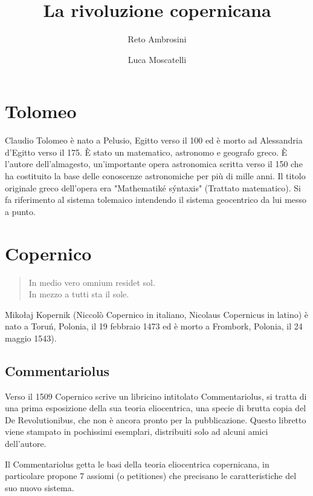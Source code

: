 \documentclass[a4paper]{scrartcl}
\begin{document}
\author{Reto Ambrosini \and Luca Moscatelli}
\title{La rivoluzione copernicana}

\maketitle

\tableofcontents

\newpage

\section{Tolomeo}

Claudio Tolomeo è nato a Pelusio, Egitto verso il 100 ed è morto ad Alessandria d'Egitto verso il 175. È stato un matematico, astronomo e geografo greco. È l'autore dell'almagesto, un'importante opera astronomica scritta verso il 150 che ha costituito la base delle conoscenze astronomiche per più di mille anni. Il titolo originale greco dell'opera era "Mathematiké sýntaxis" (Trattato matematico).
Si fa riferimento al sistema tolemaico intendendo il sistema geocentrico da lui messo a punto.

\section{Copernico}

\begin{quote}
	In medio vero omnium residet sol. \autocite[98]{copernico:derevolutionibus}\\ 
	In mezzo a tutti sta il sole.
\end{quote}


Mikołaj Kopernik (Niccolò Copernico in italiano, Nicolaus Copernicus in latino) è nato a Toruń, Polonia, il 19 febbraio 1473 ed è morto a Frombork, Polonia, il 24 maggio 1543).

\subsection{Commentariolus}

Verso il 1509 Copernico scrive un libricino intitolato Commentariolus, si tratta di una prima esposizione della sua teoria eliocentrica, una specie di brutta copia del De Revolutionibus, che non è ancora pronto per la pubblicazione. Questo libretto viene stampato in pochissimi esemplari, distribuiti solo ad alcuni amici dell'autore.

Il Commentariolus getta le basi della teoria eliocentrica copernicana, in particolare propone 7 assiomi (o petitiones) che precisano le caratteristiche del suo nuovo sistema.
\end{document}
